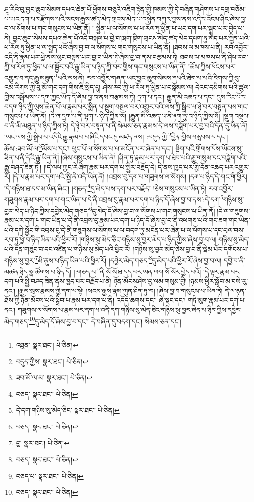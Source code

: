 ཤཱ་རིའི་བུ་བྱང་ཆུབ་སེམས་དཔའ་ཆེན་པོ་ཕྱོགས་བཅུའི་འཇིག་རྟེན་གྱི་ཁམས་ཀྱི་དེ་བཞིན་གཤེགས་པ་དགྲ་བཅོམ་པ་ཡང་དག་པར་རྫོགས་པའི་སངས་རྒྱས་ཚད་མེད་གྲངས་མེད་པ་བསྙེན་བཀུར་བྱས་ནས་འདིར་འོངས་ཤིང་ཞེས་བྱ་བ་ལ་སོགས་པ་གང་གསུངས་པ་ཡིན་ནོ། །
སྦྱིན་པ་ལ་སོགས་པ་ཕ་རོལ་ཏུ་ཕྱིན་པ་ཡང་དག་པར་སྒྲུབ་པར་བྱེད་པ་ནི། བྱང་ཆུབ་སེམས་དཔའ་ཆེན་པོ་འདི་བསྐལ་པ་བྱེ་བ་ཁྲག་ཁྲིག་གྲངས་མེད་ཚད་མེད་དཔག་ཏུ་མེད་པར་སྦྱིན་པའི་ཕ་རོལ་ཏུ་ཕྱིན་པ་ལ་སྤྱད་པའོ་ཞེས་བྱ་བ་ལ་སོགས་པ་གང་གསུངས་པ་ཡིན་ནོ། །ཐབས་ལ་མཁས་པ་ནི། རབ་འབྱོར་འདི་ནི་རྣམ་པར་ཕྱེ་ནས་ལུང་བསྟན་པར་བྱ་བ་ཡིན་ཏེ་ཞེས་བྱ་བ་ནས་བརྩམས་ཏེ། ཐབས་ལ་མཁས་པ་ནི་ཤེས་རབ་ཀྱི་ཕ་རོལ་ཏུ་ཕྱིན་པ་ལ་སྦྱོར་བའི་རྒྱུ་ཡིན་པ་ཉིད་ཀྱི་བར་གྱིས་གང་གསུངས་པ་ཡིན་ནོ། །ཆོས་ཀྱིས་ཕོངས་པར་འགྱུར་བ་དང་རྒྱུ་མཐུན་\footnote{འཐུན་  སྣར་ཐང་།  པེ་ཅིན། }པའི་ལས་ནི། རབ་འབྱོར་གཞན་ཡང་བྱང་ཆུབ་སེམས་དཔའི་ཐེག་པ་པའི་རིགས་ཀྱི་བུ་འམ་རིགས་ཀྱི་བུ་མོ་གང་དག་གིས་ཇི་སྲིད་དུ། ཤེས་རབ་ཀྱི་ཕ་རོལ་ཏུ་ཕྱིན་པ་བསྒོམས་ལ། དེའང་དམིགས་པའི་ཚུལ་གྱིས་བསྒོམས་པ་དག་ཀྱང་ཡོད་དོ་ཞེས་བྱ་བ་ནས་བརྩམས་ཏེ། དྲག་པ་དང་། རྒྱུན་མི་འཆད་པ་དང་། དུས་རིང་པོར་བདག་ཉིད་ཀྱི་ལུས་ཆེན་པོ་ལ་རྣམ་པར་སྨིན་པ་སྡུག་བསྔལ་བར་འགྱུར་བའི་ལས་ཀྱི་སྒྲིབ་པ་ཉེ་བར་བསྟན་པས་གང་གསུངས་པ་ཡིན་ནོ། །དེ་ལ་དྲག་པ་ནི་ལྷག་པ་ཉིད་ཀྱིས་སོ། །རྒྱུན་མི་འཆད་པ་ནི་རྟག་ཏུ་བ་ཉིད་ཀྱིས་སོ། །སྡུག་བསྔལ་བ་ནི་མི་མཐུན་པ་ཉིད་ཀྱིས་ཏེ། དེ་ཉེ་བར་བསྟན་པ་ནི་སེམས་ཅན་རྣམས་དེ་ལས་བཟློག་པར་བྱ་བའི་དོན་དུ་ཡིན་ནོ། །ཡང་ལས་ཀྱི་སྒྲིབ་པ་འདིའི་རྒྱུ་རྣམ་པ་བཞིའི་དབང་དུ་མཛད་ནས། :བདུད་ཀྱི་\footnote{བདུད་ཀྱིས་  སྣར་ཐང་།  པེ་ཅིན། }བྱིན་གྱིས་བརླབས་པ་དང་། ཆོས་:ཟབ་མོ་ལ་\footnote{ཟབ་མོ་ལ་མ་  སྣར་ཐང་།  པེ་ཅིན། }མོས་པ་དང་། ཕུང་པོ་ལ་སོགས་པ་ལ་མངོན་པར་ཞེན་པ་དང་། སྡིག་པའི་གྲོགས་པོས་ཡོངས་སུ་ཟིན་པ་ནི་དེའི་རྒྱུ་ཡིན་ནོ། །ཞེས་གསུངས་པ་ཡིན་ནོ། །ཤིན་ཏུ་རྣམ་པར་དག་པ་ཐོབ་པའི་རྒྱུ་གསུམ་དང་བཟློག་པའི་རྒྱུ་བཤད་ཟིན་ཏོ།། །།དེ་ལས་ཀྱང་རེ་ཞིག་རྣམ་པར་དག་པ་སྤྱིར་བརྗོད་དེ། དེ་ནས་ཁྱད་པར་གྱི་དོན་འཆད་པར་འགྱུར་རོ། །དེ་ལ་རྣམ་པར་དག་པའི་སྤྱི་ནི་འདི་ཡིན་ནོ། །འབྲས་བུ་དག་པ་གཟུགས་ལ་སོགས། །དག་པ་ཉིད་དེ་གང་གི་ཕྱིར། །དེ་གཉིས་ཐ་དད་མ་ཡིན་ཞིང་། །གཅད་\footnote{བཅད་  སྣར་ཐང་།  པེ་ཅིན། }དུ་མེད་པས་དག་པར་བརྗོད། །ཅེས་གསུངས་པ་ཡིན་ཏེ། རབ་འབྱོར་གཟུགས་རྣམ་པར་དག་པ་གང་ཡིན་པ་དེ་ནི་འབྲས་བུ་རྣམ་པར་དག་པ་ཉིད་དོ་ཞེས་བྱ་བ་ནས་:དེ་དག་\footnote{དེ་དག་གཉིས་སུ་མེད་ཅིང་  སྣར་ཐང་།  པེ་ཅིན། }གཉིས་སུ་བྱར་མེད་པ་ཉིད་ཀྱིས་དབྱེར་མེད་གཅད་\footnote{བཅད་  སྣར་ཐང་།  པེ་ཅིན། }དུ་མེད་དོ་ཞེས་བྱ་བ་ལ་སོགས་པ་གང་གསུངས་པ་ཡིན་ནོ། །དེ་ལ་གཟུགས་རྣམ་པར་དག་པ་གང་ཡིན་པ་དེ་ནི་འབྲས་བུ་རྣམ་པར་དག་པ་ཉིད་དོ་ཞེས་བྱ་བ་ནི་འཕགས་པའི་གང་ཟག་གང་ཡིན་པའི་དགེ་སྦྱོང་གི་འབྲས་བུ་དེ་ནི་གཟུགས་ལ་སོགས་པ་ལ་བདག་ཏུ་མངོན་པར་ཞེན་པ་ལ་སོགས་པ་དང་བྲལ་བས་རབ་ཏུ་ཕྱེ་བ་ཉིད་ཡིན་པའི་ཕྱིར་རོ། །གཉིས་སུ་མེད་ཅིང་གཉིས་སུ་བྱར་མེད་པ་ཉིད་ཀྱིས་ཞེས་བྱ་བ་ལ། གཉིས་སུ་མེད་པའི་དོན་གཟུང་བ་དང་འཛིན་པ་གཉིས་སུ་མེད་པའི་ཕྱིར་རོ། །གཉིས་སུ་བྱར་མེད་ཅེས་བྱ་བ་ནི་ལྡེམ་པོར་དགོངས་པ་གཉིས་སུ་བྱར་\footnote{བྱ་  སྣར་ཐང་།  པེ་ཅིན། }མི་ནུས་པ་ཉིད་ཡིན་པའི་ཕྱིར་རོ། །དབྱེར་མེད་གཅད་\footnote{བཅད་  སྣར་ཐང་།  པེ་ཅིན། }དུ་མེད་པའི་ཕྱིར་རོ་ཞེས་བྱ་བ་ལ། དབྱེ་བ་ནི་མཚན་ཉིད་སྣ་ཚོགས་པ་ཉིད་དོ། །:གཅད་པ་\footnote{བཅད་པ་  སྣར་ཐང་།  པེ་ཅིན། }ནི་སོ་སོ་ཐ་དད་པར་ཡན་ལག་སོ་སོར་བྱེད་པའོ། །དེ་ལྟར་རྣམ་པར་དག་པའི་སྤྱི་བཤད་ཟིན་ནས་ཁྱད་པར་བརྗོད་པ་ནི། ཉོན་མོངས་ཤེས་བྱ་ལམ་གསུམ་གྱི། །ཉམས་ཕྱིར་སློབ་མ་བསེ་རུ་དང་། །རྒྱལ་སྲས་རྣམས་ཀྱི་དག་པ་སྟེ། །སངས་རྒྱས་རྣམ་ཀུན་ཤིན་ཏུ་བ། །ཞེས་བྱ་བ་གསུངས་པ་ཡིན་ཏེ། དེ་ལ་ཉན་ཐོས་ཀྱི་ཉོན་མོངས་པའི་སྒྲིབ་པ་རྣམ་པར་དག་པ་ནི། འདོད་ཆགས་དང་། ཞེ་སྡང་དང་། གཏི་མུག་རྣམ་པར་དག་པ་དང་། གཟུགས་ལ་སོགས་པ་རྣམ་པར་དག་པ་འདི་དག་གཉིས་སུ་མེད་ཅིང་གཉིས་སུ་བྱར་མེད་པ་ཉིད་ཀྱིས་དབྱེར་མེད་གཅད་\footnote{བཅད་  སྣར་ཐང་།  པེ་ཅིན། }དུ་མེད་དོ་ཞེས་བྱ་བ་དང་། དེ་བཞིན་དུ་བདག་དང་། སེམས་ཅན་དང་། 